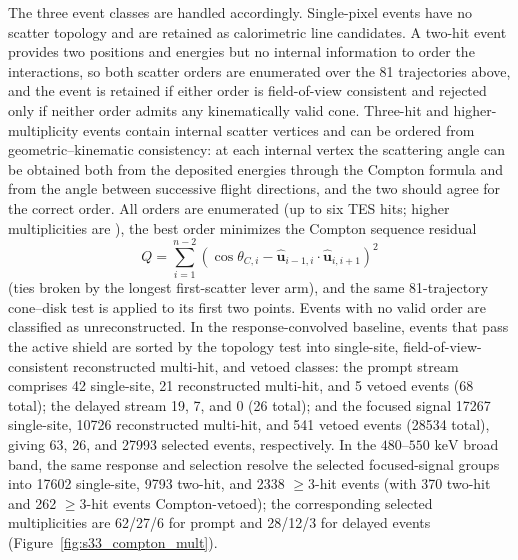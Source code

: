 \documentclass[11pt]{article}
\newcommand{\keV}{\ensuremath{\,\mathrm{keV}}}
\begin{document}
The three event classes are handled accordingly. Single-pixel events have no
scatter topology and are retained as calorimetric line candidates. A two-hit
event provides two positions and energies but no internal information to order
the interactions, so both scatter orders are enumerated over the 81 trajectories
above, and the event is retained if either order is field-of-view consistent and
rejected only if neither order admits any kinematically valid cone. Three-hit
and higher-multiplicity events contain internal scatter vertices and can be
ordered from geometric--kinematic consistency: at each internal vertex the
scattering angle can be obtained both from the deposited energies through the
Compton formula and from the angle between successive flight directions, and the
two should agree for the correct order. All orders are enumerated (up to six TES
hits; higher multiplicities are ), the best order
minimizes the Compton sequence residual
\begin{equation}
  Q = \sum_{i=1}^{n-2}
  \left(\cos\theta_{C,i} -
  \hat{\mathbf u}_{i-1,i}\cdot\hat{\mathbf u}_{i,i+1}\right)^2
\end{equation}
(ties broken by the longest first-scatter lever arm), and the same 81-trajectory
cone--disk test is applied to its first two points. Events with no valid order
are classified as unreconstructed. In the response-convolved baseline, events
that pass the active shield are sorted by the topology test into single-site,
field-of-view-consistent reconstructed multi-hit, and vetoed classes: the
prompt stream comprises 42 single-site, 21 reconstructed multi-hit, and 5
vetoed events (68 total); the delayed stream 19, 7, and 0 (26 total); and the
focused signal 17267 single-site, 10726 reconstructed multi-hit, and 541 vetoed
events (28534 total), giving 63, 26, and 27993 selected events, respectively.
In the $480$--$550\,\keV$ broad band, the same response and selection resolve
the selected focused-signal groups into 17602 single-site, 9793 two-hit, and
2338 $\geq$3-hit events (with 370 two-hit and 262 $\geq$3-hit events
Compton-vetoed); the corresponding selected multiplicities are 62/27/6 for
prompt and 28/12/3 for delayed events (Figure~\ref{fig:s33_compton_mult}).
\end{document}

